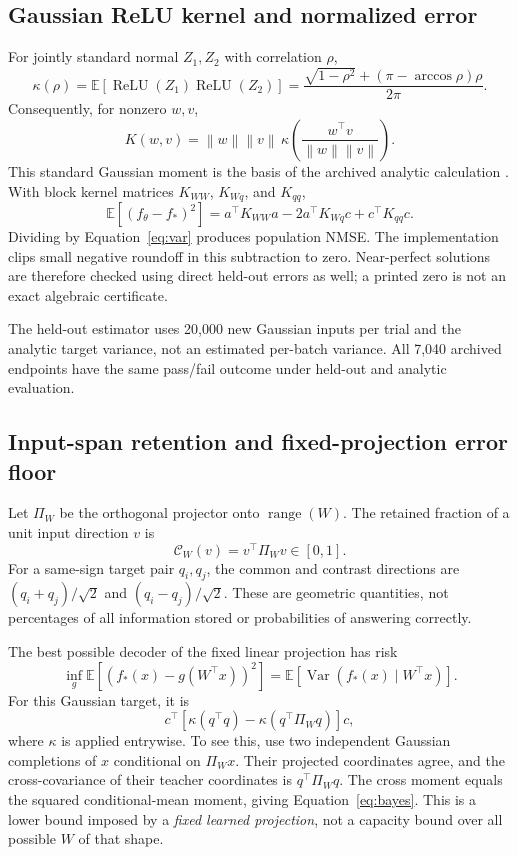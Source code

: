 \documentclass[11pt,letterpaper]{article}
\theoremstyle{remark}\newtheorem{remark}{Remark}
\newcommand{\E}{\mathbb E}
\newcommand{\Var}{\operatorname{Var}}
\newcommand{\relu}{\operatorname{ReLU}}
\newcommand{\range}{\operatorname{range}}
\newcommand{\norm}[1]{\left\lVert#1\right\rVert}
\begin{document}
\subsection{Gaussian ReLU kernel and normalized error}
For jointly standard normal $Z_1,Z_2$ with correlation $\rho$,
\begin{equation}\label{eq:kappa}
\kappa(\rho)=\E[\relu(Z_1)\relu(Z_2)]
=\frac{\sqrt{1-\rho^2}+(\pi-\arccos\rho)\rho}{2\pi}.
\end{equation}
Consequently, for nonzero $w,v$,
\begin{equation}
K(w,v)=\norm w\norm v\,\kappa\left(\frac{w^\top v}{\norm w\norm v}\right).
\end{equation}
This standard Gaussian moment is the basis of the archived analytic calculation \cite{arc}. With block kernel matrices $K_{WW}$, $K_{Wq}$, and $K_{qq}$,
\begin{equation}
\E[(f_\theta-f_*)^2]=a^\top K_{WW}a-2a^\top K_{Wq}c+c^\top K_{qq}c.
\end{equation}
Dividing by Equation~\eqref{eq:var} produces population NMSE. The implementation clips small negative roundoff in this subtraction to zero. Near-perfect solutions are therefore checked using direct held-out errors as well; a printed zero is not an exact algebraic certificate.

The held-out estimator uses 20,000 new Gaussian inputs per trial and the analytic target variance, not an estimated per-batch variance. All 7,040 archived endpoints have the same pass/fail outcome under held-out and analytic evaluation.

\subsection{Input-span retention and fixed-projection error floor}
Let $\Pi_W$ be the orthogonal projector onto $\range(W)$. The retained fraction of a unit input direction $v$ is
\begin{equation}
\mathcal C_W(v)=v^\top\Pi_Wv\in[0,1].
\end{equation}
For a same-sign target pair $q_i,q_j$, the common and contrast directions are $(q_i+q_j)/\sqrt2$ and $(q_i-q_j)/\sqrt2$. These are geometric quantities, not percentages of all information stored or probabilities of answering correctly.

The best possible decoder of the fixed linear projection has risk
\begin{equation}
\inf_g\E[(f_*(x)-g(W^\top x))^2]
=\E[\Var(f_*(x)\mid W^\top x)].
\end{equation}
For this Gaussian target, it is
\begin{equation}\label{eq:bayes}
c^\top\!\left[\kappa(q^\top q)-\kappa(q^\top\Pi_Wq)\right]c,
\end{equation}
where $\kappa$ is applied entrywise. To see this, use two independent Gaussian completions of $x$ conditional on $\Pi_Wx$. Their projected coordinates agree, and the cross-covariance of their teacher coordinates is $q^\top\Pi_Wq$. The cross moment equals the squared conditional-mean moment, giving Equation~\eqref{eq:bayes}. This is a lower bound imposed by a \emph{fixed learned projection}, not a capacity bound over all possible $W$ of that shape.
\end{document}
